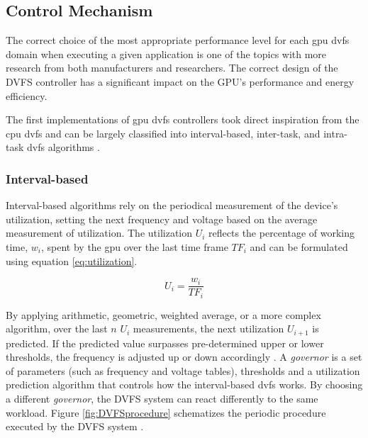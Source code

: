\subsection{Control Mechanism}

The correct choice of the most appropriate performance level for each \acrshort{gpu} \acrshort{dvfs} domain when executing a given application is one of the topics with more research from both manufacturers and researchers. The correct design of the DVFS controller has a significant impact on the GPU's performance and energy efficiency.

The first implementations of \acrshort{gpu} \acrshort{dvfs} controllers took direct inspiration from the \acrshort{cpu} \acrshort{dvfs} and can be largely classified into interval-based, inter-task, and intra-task \acrshort{dvfs} algorithms \cite{boyer_improving_2013}. 

\subsubsection{Interval-based}

Interval-based algorithms rely on the periodical measurement of the device's utilization, setting the next frequency and voltage based on the average measurement of utilization. The utilization $U_{i}$ reflects the percentage of working time, $w_{i}$, spent by the \acrshort{gpu} over the last time frame $TF_{i}$ and can be formulated using equation \ref{eq:utilization}.

\begin{equation}
    U_i=\frac{w_i}{TF_i}
    \label{eq:utilization}
\end{equation}

By applying arithmetic, geometric, weighted average, or a more complex algorithm, over the last $n$ $U_{i}$ measurements,  the next utilization $U_{i+1}$ is predicted. If the predicted value surpasses pre-determined upper or lower thresholds, the frequency is adjusted up or down accordingly \cite{seongki_gpgpu-perf:_2015}. 
A \textit{governor} is a set of parameters (such as frequency and voltage tables), thresholds and a utilization prediction algorithm that controls how the interval-based \acrshort{dvfs} works. By choosing a different \textit{governor}, the DVFS system can react differently to the same workload. Figure \ref{fig:DVFSprocedure} schematizes the periodic procedure executed by the DVFS system \cite{seongki_gpgpu-perf:_2015}. 

